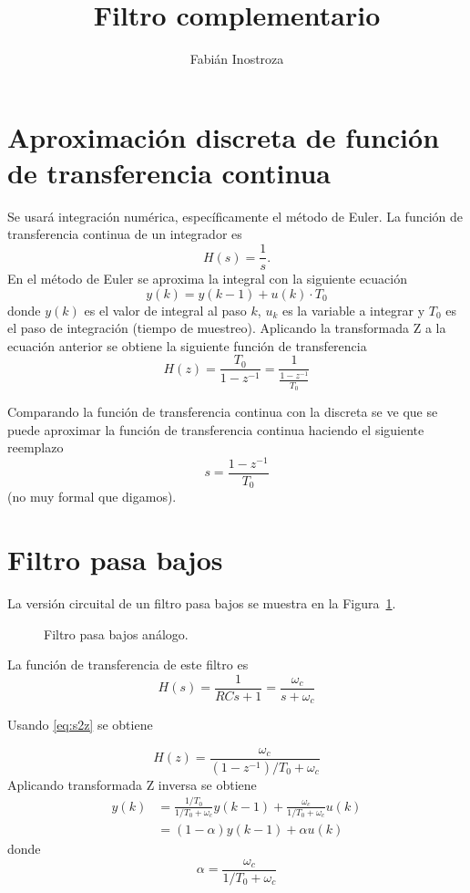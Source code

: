 \documentclass[11pt]{article} %
\title{Filtro complementario}
\author{Fabián Inostroza}
\begin{document}
\maketitle

\section{Aproximación discreta de función de transferencia continua}
Se usará integración numérica, específicamente el método de Euler.
La función de transferencia continua de un integrador es
\[ H(s) = \frac{1}{s}. \]
En el método de Euler se aproxima la integral con la siguiente 
ecuación
\[ y(k) = y(k-1)+ u(k)\cdot T_0 \]
donde \( y(k) \) es el valor de integral al paso \( k \),
\( u_k \) es la variable a integrar y \( T_0 \) es el 
 paso de integración (tiempo de muestreo). 
 Aplicando la transformada Z a la ecuación 
anterior se obtiene la siguiente función de transferencia
\[ H(z) = \frac{T_0}{1-z^{-1}} = \frac{1}{ \frac{1-z^{-1}}{T_0} } \]

Comparando la función de transferencia continua con la 
discreta se ve que se puede aproximar la función de 
 transferencia continua haciendo el siguiente reemplazo 
\begin{equation}
s = \frac{1-z^{-1}}{T_0} \label{eq:s2z}
\end{equation}
(no muy formal que digamos).
 
\section{Filtro pasa bajos}
La versión circuital de un filtro pasa bajos se muestra en la Figura~\ref{fig:LPF}.

\begin{figure}[h!tb]
\centering

\caption{Filtro pasa bajos análogo.}
\label{fig:LPF}
\end{figure}

La función de transferencia de este filtro es
\[ H(s) = \frac{1}{RCs+1} = \frac{\omega_c}{s+\omega_c} \]

Usando \eqref{eq:s2z} se obtiene

\[ H(z) = \frac{\omega_c}{(1-z^{-1})/T_0 + \omega_c} \]
Aplicando transformada Z inversa se obtiene
\begin{align*}
y(k) &= \frac{1/T_0}{1/T_0+\omega_c}y(k-1) + 
\frac{\omega_c}{1/T_0+\omega_c} u(k)  \\
	&= (1-\alpha)y(k-1) + \alpha u(k)
\end{align*}
donde
\[ \alpha = \frac{\omega_c}{1/T_0+\omega_c} \]
\end{document}
